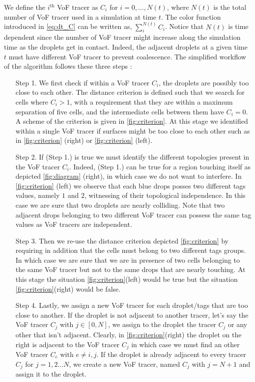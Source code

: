 We define the $i^\text{th}$ VoF tracer as $C_i$ for $i =0,\ldots,N(t)$, where $N(t)$ is the total number of VoF tracer used in a simulation at time $t$.
The color function introduced in \ref{eq:dt_C} can be written as, $\sum_i^{N(t)} C_i$. 
Notice that $N(t)$ is time dependent since the number of VoF tracer might increase along the simulation time as the droplets get in contact. 
Indeed, the adjacent droplets at a given time $t$ must have different VoF tracer to prevent coalescence. 
The simplified workflow of the algorithm follows these three steps : 
\begin{enumerate}
    \item[Step 1.] We first check if within a VoF tracer $C_i$, the droplets are possibly too close to each other. 
    The distance criterion is defined such that we search for cells where $C_i > 1$, with a requirement that they are within a maximum separation of five cells, and the intermediate cells between them have $C_i = 0$.
    A scheme of the criterion is given in \ref{fig:criterion}.  
    At this stage we identified within a single VoF tracer if surfaces might be too close to each other such as in \ref{fig:criterion} (right) or \ref{fig:criterion} (left).
    \item[Step 2.] 
    If (Step 1.) is true we must identify the different topologies present in the VoF tracer $C_i$. 
    Indeed, (Step 1.) can be true for a region touching itself as depicted  \ref{fig:diagram} (right), in which case we do not want to interfere. 
    In \ref{fig:criterion} (left) we observe that each blue drops posses two different tags values, namely $1$ and $2$, witnessing of their topological independence.
    In this case we are sure that two droplets are nearly colliding.  
    Note that two adjacent drops belonging to two different VoF tracer can possess the same tag values as VoF tracers are independent. 
    \item[Step 3.] Then we re-use the distance criterion depicted \ref{fig:criterion} by requiring in addition that the cells must belong to two different tags groups. 
    In which case we are sure that we are in presence of two cells belonging to the same VoF tracer but not to the same drops that are nearly touching.
    At this stage the situation \ref{fig:criterion}(left) would be true but the situation \ref{fig:criterion}(right) would be false. 
    \item[Step 4.] Lastly, we assign a new VoF tracer for each droplet/tags that are too close to another. 
    If the droplet is not adjacent to another tracer, let's say the VoF tracer $C_j$ with $j \in [0,N]$, we assign to the droplet the tracer $C_j$ or any other that isn't adjacent. 
    Clearly, in \ref{fig:criterion}(right) the droplet on the right is adjacent to the VoF tracer $C_j$ in which case we must find an other VoF tracer $C_e$ with $e \neq i,j$. 
    If the droplet is already adjacent to every tracer $C_j$ for $j = 1,2\ldots N$, we create a new VoF tracer, named $C_j$  with $j = N+1$ and assign it to the droplet. 
\end{enumerate}
